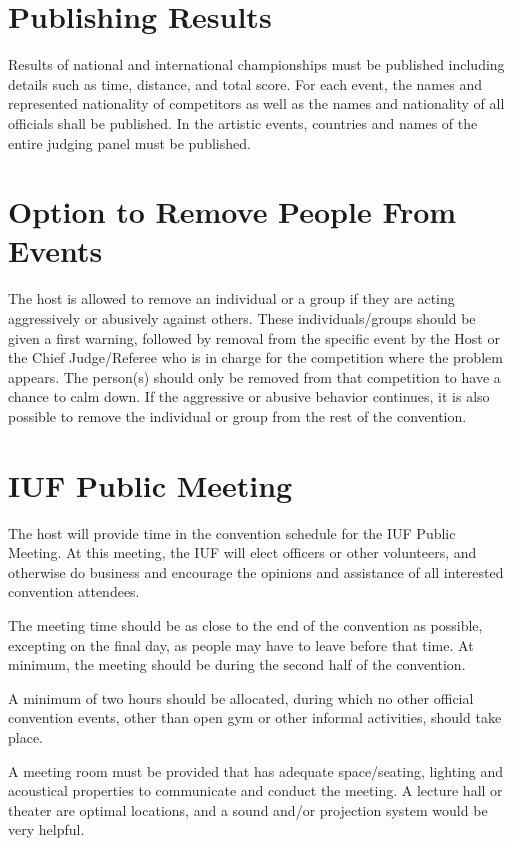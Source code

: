 \section{Publishing Results \label{sec:publishing_results}}
Results of national and international championships must be published including details such as time, distance, and total score.
For each event, the names and represented nationality of competitors as well as the names and nationality of all officials shall be published.
In the artistic events, countries and names of the entire judging panel must be published.

\section{Option to Remove People From Events}
The host is allowed to remove an individual or a group if they are acting aggressively or abusively against others.
These individuals/groups should be given a first warning, followed by removal from the specific event by the Host or the Chief Judge/Referee who is in charge for the competition where the problem appears.
The person(s) should only be removed from that competition to have a chance to calm down.
If the aggressive or abusive behavior continues, it is also possible to remove the individual or group from the rest of the convention.

\section{IUF Public Meeting}

The host will provide time in the convention schedule for the IUF Public Meeting.
At this meeting, the IUF will elect officers or other volunteers, and otherwise do business and encourage the opinions and assistance of all interested convention attendees.

The meeting time should be as close to the end of the convention as possible, excepting on the final day, as people may have to leave before that time.
At minimum, the meeting should be during the second half of the convention.

A minimum of two hours should be allocated, during which no other official convention events, other than open gym or other informal activities, should take place.

A meeting room must be provided that has adequate space/seating, lighting and acoustical properties to communicate and conduct the meeting.
A lecture hall or theater are optimal locations, and a sound and/or projection system would be very helpful.

